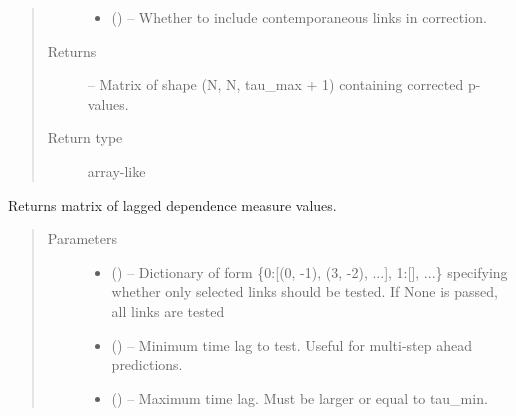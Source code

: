 \documentclass[letterpaper,10pt,english]{sphinxmanual}
\begin{document}
\begin{fulllineitems}
\begin{fulllineitems}
\begin{quote}
\begin{description}
\begin{itemize}
\item {} 
 (\sphinxstyleliteralemphasis{, }\sphinxstyleliteralemphasis{ (}\sphinxstyleliteralemphasis{)}\sphinxstyleliteralemphasis{}) -- Whether to include contemporaneous links in correction.

\end{itemize}

\item[{Returns}] \leavevmode
{} -- Matrix of shape (N, N, tau\_max + 1) containing corrected p-values.

\item[{Return type}] \leavevmode
array-like

\end{description}\end{quote}

\end{fulllineitems}


\begin{fulllineitems}
\label{\detokenize{index:tigramite.pcmci.PCMCI.get_lagged_dependencies}}
Returns matrix of lagged dependence measure values.
\begin{quote}\begin{description}
\item[{Parameters}] \leavevmode\begin{itemize}
\item {} 
 () -- Dictionary of form \{0:{[}(0, -1), (3, -2), ...{]}, 1:{[}{]}, ...\}
specifying whether only selected links should be tested. If None is
passed, all links are tested

\item {} 
 (\sphinxstyleliteralemphasis{, }) -- Minimum time lag to test. Useful for multi-step ahead predictions.

\item {} 
 (\sphinxstyleliteralemphasis{, }) -- Maximum time lag. Must be larger or equal to tau\_min.


\end{itemize}
\end{description}
\end{quote}
\end{fulllineitems}
\end{fulllineitems}
\end{document}
